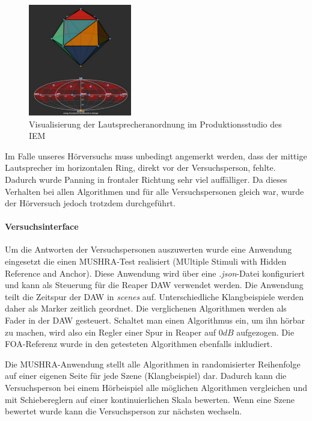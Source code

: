 \begin{figure}[!ht]
  \centering
  \includegraphics[width=0.4\textwidth]{aufbau/plots/speaker_pos_prod_studio.png}
  \caption{Visualisierung der Lautsprecheranordnung im Produktionsstudio des IEM \protect\footnotemark}
  \label{fig:aufb:prodstud}
\end{figure}


Im Falle unseres Hörversuchs muss unbedingt angemerkt werden, dass der mittige Lautsprecher im horizontalen Ring, direkt vor der Versuchsperson, fehlte. Dadurch wurde Panning in frontaler Richtung sehr viel auffälliger. Da dieses Verhalten bei allen Algorithmen und für alle Versuchspersonen gleich war, wurde der Hörversuch jedoch trotzdem durchgeführt.

\paragraph{Versuchsinterface}
Um die Antworten der Versuchspersonen auszuwerten wurde eine Anwendung eingesetzt die einen MUSHRA-Test realisiert (MUltiple Stimuli with Hidden Reference and Anchor). Diese Anwendung wird über eine \textit{.json}-Datei konfiguriert und kann als Steuerung für die Reaper DAW verwendet werden. Die Anwendung teilt die Zeitspur der DAW in \textit{scenes} auf. Unterschiedliche Klangbeispiele werden daher als Marker zeitlich geordnet. Die verglichenen Algorithmen werden als Fader in der DAW gesteuert. Schaltet man einen Algorithmus ein, um ihn hörbar zu machen, wird also ein Regler einer Spur in Reaper auf $0dB$ aufgezogen. Die FOA-Referenz wurde in den getesteten Algorithmen ebenfalls inkludiert.

Die MUSHRA-Anwendung stellt alle Algorithmen in randomisierter Reihenfolge auf einer eigenen Seite für jede Szene (Klangbeispiel) dar. Dadurch kann die Versuchsperson bei einem Hörbeispiel alle möglichen Algorithmen vergleichen und mit Schiebereglern auf einer kontinuierlichen Skala bewerten. Wenn eine Szene bewertet wurde kann die Versuchsperson zur nächsten wechseln.
